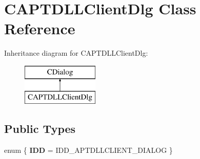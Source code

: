 \hypertarget{class_c_a_p_t_d_l_l_client_dlg}{}\section{C\+A\+P\+T\+D\+L\+L\+Client\+Dlg Class Reference}
\label{class_c_a_p_t_d_l_l_client_dlg}
Inheritance diagram for C\+A\+P\+T\+D\+L\+L\+Client\+Dlg\+:\begin{figure}[H]
\begin{center}
\leavevmode
\includegraphics[height=2.000000cm]{class_c_a_p_t_d_l_l_client_dlg}
\end{center}
\end{figure}
\subsection*{Public Types}
\begin{DoxyCompactItemize}
\item 
enum \{ {\bfseries I\+DD} = I\+D\+D\+\_\+\+A\+P\+T\+D\+L\+L\+C\+L\+I\+E\+N\+T\+\_\+\+D\+I\+A\+L\+OG
 \}\hypertarget{class_c_a_p_t_d_l_l_client_dlg_a4ea39522e6c150075589cc45c45b3080}{}\label{class_c_a_p_t_d_l_l_client_dlg_a4ea39522e6c150075589cc45c45b3080}

\end{DoxyCompactItemize}
